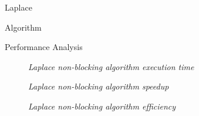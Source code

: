 \begin{chapter}{Laplace}
\begin{section}{Algorithm}
\begin{subsection}{Performance Analysis}
            \begin{figure}[ht]
                \centering
                
                \caption{\emph{Laplace non-blocking algorithm execution time}}
                \label{fig:laplace_nb-exectime}
            \end{figure}
            \begin{figure}[ht]
                \centering
                
                \caption{\emph{Laplace non-blocking algorithm speedup}}
                \label{fig:laplace_nb-speedup}
            \end{figure}
            \begin{figure}[ht]
                \centering
                
                \caption{\emph{Laplace non-blocking algorithm efficiency}}
                \label{fig:laplace_nb-efficiency}
            \end{figure}
        \end{subsection}
    \end{section}
\end{chapter}